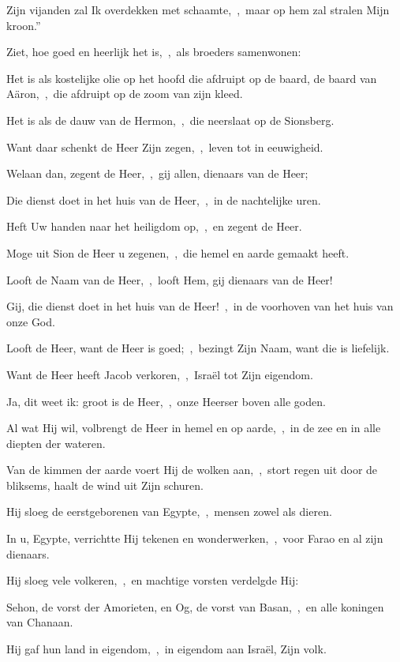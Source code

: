 \documentclass[12pt,twoside,a5paper]{article}
\begin{document}
\begin{halfparskip}
  Zijn vijanden zal Ik overdekken met schaamte,~\sep\ maar op hem zal stralen Mijn kroon.''

   Ziet, hoe goed en heerlijk het is,~\sep\ als broeders samenwonen:

  Het is als kostelijke olie op het hoofd die afdruipt op de baard, de baard van Aäron,~\sep\ die afdruipt op de zoom van zijn kleed.

  Het is als de dauw van de Hermon,~\sep\ die neerslaat op de Sionsberg.

  Want daar schenkt de Heer Zijn zegen,~\sep\ leven tot in eeuwigheid.

   Welaan dan, zegent de Heer,~\sep\ gij allen, dienaars van de Heer;

  Die dienst doet in het huis van de Heer,~\sep\ in de nachtelijke uren.

  Heft Uw handen naar het heiligdom op,~\sep\ en zegent de Heer.

  Moge uit Sion de Heer u zegenen,~\sep\ die hemel en aarde gemaakt heeft.

   Looft de Naam van de Heer,~\sep\ looft Hem, gij dienaars van de Heer!

  Gij, die dienst doet in het huis van de Heer!~\sep\ in de voorhoven van het huis van onze God.

  Looft de Heer, want de Heer is goed;~\sep\ bezingt Zijn Naam, want die is liefelijk.

  Want de Heer heeft Jacob verkoren,~\sep\ Israël tot Zijn eigendom.

  Ja, dit weet ik: groot is de Heer,~\sep\ onze Heerser boven alle goden.

  Al wat Hij wil, volbrengt de Heer in hemel en op aarde,~\sep\ in de zee en in alle diepten der wateren.

  Van de kimmen der aarde voert Hij de wolken aan,~\sep\ stort regen uit door de bliksems, haalt de wind uit Zijn schuren.

  Hij sloeg de eerstgeborenen van Egypte,~\sep\ mensen zowel als dieren.

  In u, Egypte, verrichtte Hij tekenen en wonderwerken,~\sep\ voor Farao en al zijn dienaars.

  Hij sloeg vele volkeren,~\sep\ en machtige vorsten verdelgde Hij:

  Sehon, de vorst der Amorieten, en Og, de vorst van Basan,~\sep\ en alle koningen van Chanaan.

  Hij gaf hun land in eigendom,~\sep\ in eigendom aan Israël, Zijn volk.


\end{halfparskip}
\end{document}

